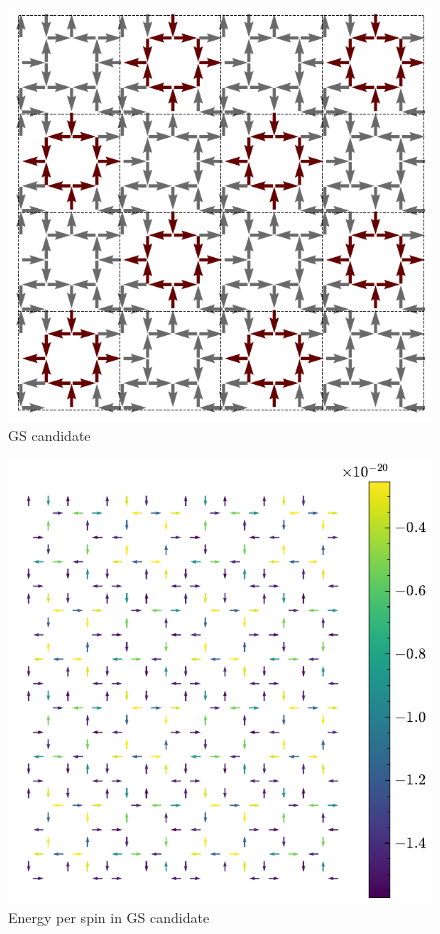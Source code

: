 \documentclass[pre,reprint,superscriptaddress]{revtex4-2}
\begin{document}
\begin{figure}
        \includegraphics[width=\linewidth]{4x4GS_candidate.pdf}         \caption{\label{fig:fig_gs}GS candidate}
\end{figure}
\begin{figure}
        \includegraphics[width=\linewidth]{figs/4x4Cells_energy.pdf}         \caption{\label{fig:fig_gs_e}Energy per spin in GS candidate}
\end{figure}
\end{document}
